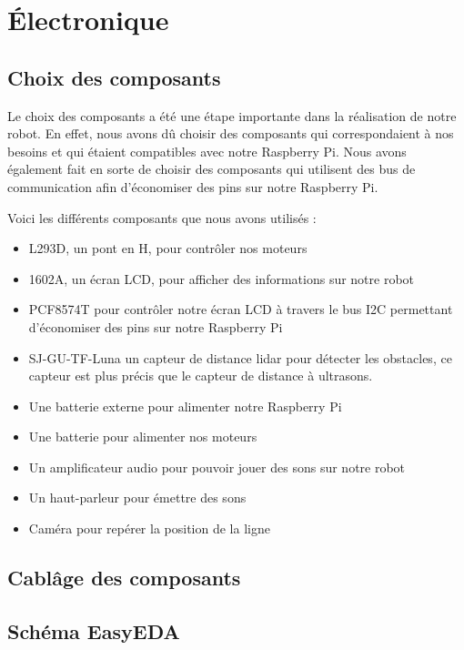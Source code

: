 \section{Électronique}

\subsection{Choix des composants}

Le choix des composants a été une étape importante dans la réalisation de notre robot.
En effet, nous avons dû choisir des composants qui correspondaient à nos besoins et qui étaient compatibles avec notre Raspberry Pi. 
Nous avons également fait en sorte de choisir des composants qui utilisent des bus de communication afin d'économiser des pins sur notre Raspberry Pi.

Voici les différents composants que nous avons utilisés :
\begin{itemize}
    \item L293D, un pont en H, pour contrôler nos moteurs
    \item 1602A, un écran LCD, pour afficher des informations sur notre robot
    \item PCF8574T pour contrôler notre écran LCD à travers le bus I2C permettant d'économiser des pins sur notre Raspberry Pi
    \item SJ-GU-TF-Luna un capteur de distance lidar pour détecter les obstacles, ce capteur est plus précis que le capteur de distance à ultrasons.
    \item Une batterie externe pour alimenter notre Raspberry Pi
    \item Une batterie pour alimenter nos moteurs
    \item Un amplificateur audio pour pouvoir jouer des sons sur notre robot
    \item Un haut-parleur pour émettre des sons
    \item Caméra pour repérer la position de la ligne
\end{itemize}

\subsection{Cablâge des composants}

\todo

\subsection{Schéma EasyEDA}

\todo